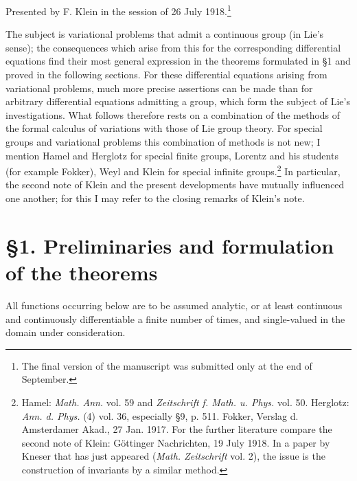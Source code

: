\documentclass[11pt]{article}
\begin{document}
\vspace{3em}
\begin{center}
Presented by F. Klein in the session of 26 July 1918.\footnote{The final version of the manuscript was submitted only at the end of September.}
\end{center}

The subject is variational problems that admit a continuous group (in Lie's sense); the consequences which arise from this for the corresponding differential equations find their most general expression in the theorems formulated in \S{}1 and proved in the following sections. For these differential equations arising from variational problems, much more precise assertions can be made than for arbitrary differential equations admitting a group, which form the subject of Lie's investigations. What follows therefore rests on a combination of the methods of the formal calculus of variations with those of Lie group theory. For special groups and variational problems this combination of methods is not new; I mention Hamel and Herglotz for special finite groups, Lorentz and his students (for example Fokker), Weyl and Klein for special infinite groups.\footnote{Hamel: \emph{Math. Ann.} vol. 59 and \emph{Zeitschrift f. Math. u. Phys.} vol. 50. Herglotz: \emph{Ann. d. Phys.} (4) vol. 36, especially \S{}9, p. 511. Fokker, Verslag d. Amsterdamer Akad., 27 Jan. 1917. For the further literature compare the second note of Klein: Göttinger Nachrichten, 19 July 1918. In a paper by Kneser that has just appeared (\emph{Math. Zeitschrift} vol. 2), the issue is the construction of invariants by a similar method.} In particular, the second note of Klein and the present developments have mutually influenced one another; for this I may refer to the closing remarks of Klein's note.

\section*{\S{}1. Preliminaries and formulation of the theorems}

All functions occurring below are to be assumed analytic, or at least continuous and continuously differentiable a finite number of times, and single-valued in the domain under consideration.
\end{document}
